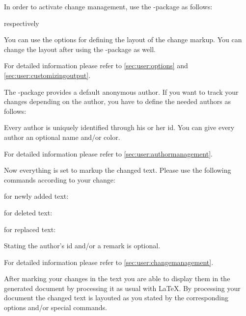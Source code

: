 
In order to activate change management, use the -package as follows:


respectively


You can use the options for defining the layout of the change markup.
You can change the layout after using the -package as well.

For detailed information please refer to \autoref{sec:user:options} and \autoref{sec:user:customizingoutput}.



The -package provides a default anonymous author.
If you want to track your changes depending on the author, you have to define the needed authors as follows:


Every author is uniquely identified through his or her id.
You can give every author an optional name and/or color.

For detailed information please refer to \autoref{sec:user:authormanagement}.



Now everything is set to markup the changed text.
Please use the following commands according to your change:

for newly added text:\\

for deleted text:\\

for replaced text:\\

Stating the author's id and/or a remark is optional.

For detailed information please refer to \autoref{sec:user:changemanagement}.



After marking your changes in the text you are able to display them in the generated document by processing it as usual with \LaTeX.
By processing your document the changed text is layouted as you stated by the corresponding options and/or special commands.

